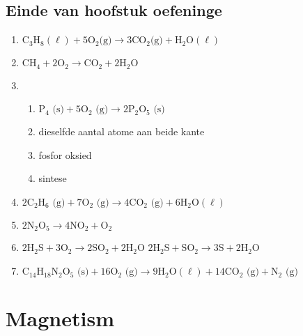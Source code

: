 \subsection{Einde van hoofstuk oefeninge}
\begin{multicols}{2}
 \begin{enumerate}[noitemsep, label=\textbf{(\arabic*)} ]
\item ${\text{C}}_{3}{\text{H}}_{8} (\ell) + 5\text{O}_{2} \text{(g)} \to 3\text{CO}_{2} \text{(g)} + \text{H}_{2}\text{O} (\ell)$
\item $\text{CH}_{4} + 2\text{O}_{2} \to \text{CO}_{2} + 2\text{H}_{2}\text{O}$
\item 
 \begin{enumerate}[noitemsep, label=\textbf{(\alph*)} ]
\item $\text{P}_{4} \text{ (s)} + 5\text{O}_{2} \text{ (g)} \to 2\text{P}_{2}\text{O}_{5} \text{ (s)}$
\item dieselfde aantal atome aan beide kante
\item fosfor oksied
\item sintese
\end{enumerate}
\item $2\text{C}_{2}\text{H}_{6} \text{ (g)} + 7\text{O}_{2} \text{ (g)} \to 4\text{CO}_{2} \text{ (g)} + 6\text{H}_{2} \text{O} (\ell)$
\item $2\text{N}_{2}\text{O}_{5} \to 4\text{NO}_{2} + \text{O}_{2}$
\item $2\text{H}_{2}\text{S} + 3\text{O}_{2} \to 2\text{SO}_{2} + 2\text{H}_{2}\text{O}$ $2\text{H}_{2}\text{S} + \text{SO}_{2} \to 3\text{S} + 2\text{H}_{2}\text{O}$
\item $\text{C}_{14}\text{H}_{18}\text{N}_{2}\text{O}_{5} \text{ (s)} + 16\text{O}_{2} \text{ (g)} \to 9\text{H}_{2} \text{O} (\ell) + 14\text{CO}_{2} \text{ (g)} + \text{N}_{2} \text{ (g)}$
 \end{enumerate}
\end{multicols}

\section{Magnetism}
